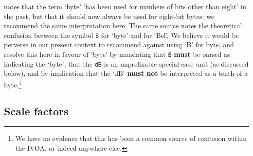 \documentclass[11pt,a4paper]{ivoa}
\newcommand{\unit}[1]{\texttt{\small\color{orange}#1}}
\newcommand*\norm[1]{\textbf{\color{ivoacolor}#1}}
\begin{document}
\citet[item 13-9.c]{std:iec80000-13} notes that the term `byte'
`has been used for numbers of bits other than eight' in the past, but
that it should now always be used for eight-bit bytes; we recommend
the same interpretation here.  The same source notes the theoretical
confusion between the symbol \unit{B} for `byte' and for `Bel'.  We
believe it would be perverse in our present context to recommend
against using `B' for byte, and resolve this here
in favour of `byte' by mandating that \unit{B} \norm{must} be parsed
as indicating the `byte', that the \unit{dB} is an
unprefixable special-case unit (as discussed below), and by
implication that the `dB'
\norm{must not} be interpreted as a tenth of a byte.\footnote{We have no
evidence that this has been a common source of confusion within the
IVOA, or indeed anywhere else.}

\subsection{Scale factors\label{sec:scaleFactors}}
\end{document}
